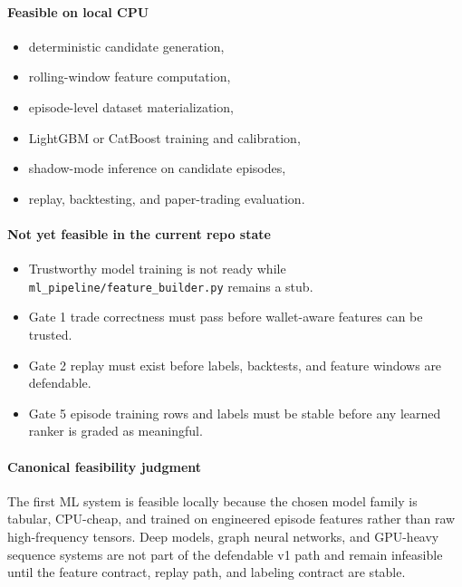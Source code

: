 \documentclass[
]{article}
\providecommand{\tightlist}{%
  \setlength{\itemsep}{0pt}\setlength{\parskip}{0pt}}
\begin{document}
\paragraph{Feasible on local CPU}

\begin{itemize}
\tightlist
\item
  deterministic candidate generation,
\item
  rolling-window feature computation,
\item
  episode-level dataset materialization,
\item
  LightGBM or CatBoost training and calibration,
\item
  shadow-mode inference on candidate episodes,
\item
  replay, backtesting, and paper-trading evaluation.
\end{itemize}

\paragraph{Not yet feasible in the current repo state}

\begin{itemize}
\tightlist
\item
  Trustworthy model training is not ready while
  \texttt{ml\_pipeline/feature\_builder.py} remains a stub.
\item
  Gate 1 trade correctness must pass before wallet-aware features can be
  trusted.
\item
  Gate 2 replay must exist before labels, backtests, and feature windows
  are defendable.
\item
  Gate 5 episode training rows and labels must be stable before any
  learned ranker is graded as meaningful.
\end{itemize}

\paragraph{Canonical feasibility judgment}

The first ML system is feasible locally because the chosen model family
is tabular, CPU-cheap, and trained on engineered episode features rather
than raw high-frequency tensors. Deep models, graph neural networks, and
GPU-heavy sequence systems are not part of the defendable v1 path and
remain infeasible until the feature contract, replay path, and labeling
contract are stable.
\end{document}
